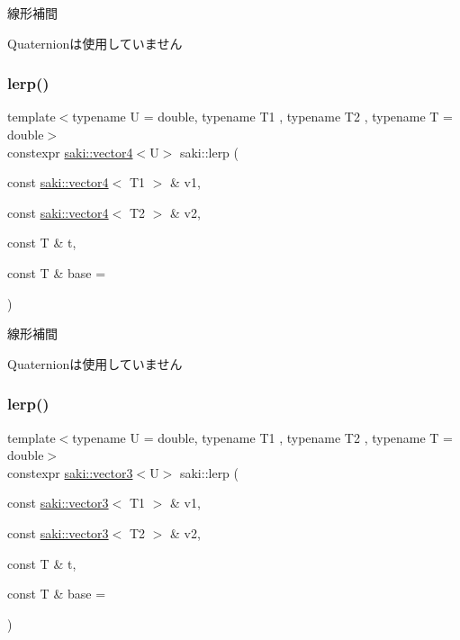 線形補間 

Quaternionは使用していません \mbox{\label{namespacesaki_acc3cd6d8e07cbfcd2691c4d9ffe25416}} 
\subsubsection{\texorpdfstring{lerp()}{lerp()}\hspace{0.1cm}{\footnotesize\ttfamily [2/3]}}
{\footnotesize\ttfamily template$<$typename U  = double, typename T1 , typename T2 , typename T  = double$>$ \\
constexpr \mbox{\hyperlink{classsaki_1_1vector4}{saki\+::vector4}}$<$U$>$ saki\+::lerp (\begin{DoxyParamCaption}\item[{const \mbox{\hyperlink{classsaki_1_1vector4}{saki\+::vector4}}$<$ T1 $>$ \&}]{v1,  }\item[{const \mbox{\hyperlink{classsaki_1_1vector4}{saki\+::vector4}}$<$ T2 $>$ \&}]{v2,  }\item[{const T \&}]{t,  }\item[{const T \&}]{base = {} }\end{DoxyParamCaption})}



線形補間 

Quaternionは使用していません \mbox{\label{namespacesaki_a1dc5233651ca71b38ed5a53ef304e480}} 
\subsubsection{\texorpdfstring{lerp()}{lerp()}\hspace{0.1cm}{\footnotesize\ttfamily [3/3]}}
{\footnotesize\ttfamily template$<$typename U  = double, typename T1 , typename T2 , typename T  = double$>$ \\
constexpr \mbox{\hyperlink{classsaki_1_1vector3}{saki\+::vector3}}$<$U$>$ saki\+::lerp (\begin{DoxyParamCaption}\item[{const \mbox{\hyperlink{classsaki_1_1vector3}{saki\+::vector3}}$<$ T1 $>$ \&}]{v1,  }\item[{const \mbox{\hyperlink{classsaki_1_1vector3}{saki\+::vector3}}$<$ T2 $>$ \&}]{v2,  }\item[{const T \&}]{t,  }\item[{const T \&}]{base = {} }\end{DoxyParamCaption})}



